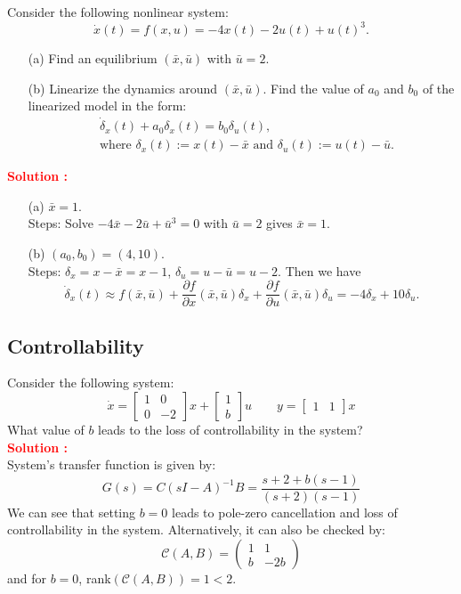 \documentclass[12pt]{article}
\newcommand{\bmat}[1]{\begin{bmatrix} #1 \end{bmatrix}}
\newcommand{\pmat}[1]{\begin{pmatrix} #1 \end{pmatrix}}
\begin{document}
Consider the following nonlinear system:
$$\dot{x}(t) = f(x,u) =  -4x(t) - 2u(t) + u(t)^3.$$
\begin{itemize}
    \item[(a)] Find an equilibrium $(\bar{x},\bar{u})$ with $\bar{u} = 2.$
    \item[(b)] Linearize the dynamics around $(\bar{x},\bar{u})$. Find the value of $a_0$ and $b_0$ of the linearized model in the form:
    \begin{align*}
        &\dot{\delta}_x(t) + a_0 \delta_x(t) = b_0 \delta_u(t), \\
        &\text{where}\,\, \delta_x(t) := x(t) - \bar{x} \,\, \text{and} \,\, \delta_u(t) := u(t) - \bar{u}.
    \end{align*}
        \end{itemize}
\textbf{\textcolor{red}{Solution :}} \\
\begin{itemize}
    \item[(a)] $\bar{x} = 1.$ \\
    Steps:
    Solve $-4\bar{x} - 2\bar{u} + \bar{u}^3 = 0$ with $\bar{u} = 2$ gives $\bar{x} = 1$.  
    \item[(b)] $(a_0, b_0) = (4, 10).$ \\
    Steps:
    $\delta_x = x - \bar{x} = x-1$, $\delta_u = u - \bar{u} = u -2$. Then we have
    \begin{equation*}
        \dot{\delta}_x(t) \approx f(\bar{x}, \bar{u}) + \frac{\partial f}{\partial x} (\bar{x}, \bar{u}) \delta_x + \frac{\partial f}{\partial u} (\bar{x}, \bar{u}) \delta_u = -4 \delta_x + 10 \delta_u.
        \end{equation*}
\end{itemize}

\clearpage
\subsection{Controllability}

Consider the following system:
$$\dot{x} =\bmat{1 & 0 \\ 0 &-2}x + \bmat{1 \\ b} u \qquad y=\bmat{1 & 1}x$$
What value of $b$ leads to the loss of controllability in the system? \\
\textbf{\textcolor{red}{Solution :}} \\
System's transfer function is given by:
$$G(s) = C(sI - A)^{-1}B= \frac{s + 2 + b(s - 1)}{(s+2)(s-1)}$$
We can see that setting $b=0$ leads to pole-zero cancellation and loss of controllability in the system. Alternatively, it can also be checked by:
$$\mathcal{C}(A,B)=\pmat{1 & 1\\ b & -2b}$$
and for $b = 0$, rank$(\mathcal{C}(A, B)) = 1 <2$.
\clearpage
\end{document}
